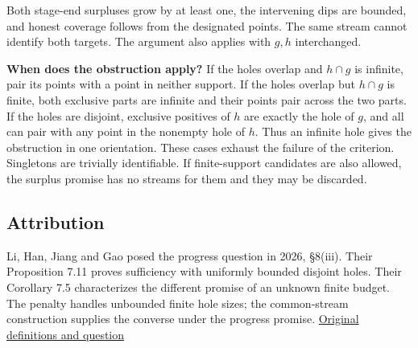 \documentclass[11pt]{article}
\begin{document}
Both stage-end surpluses grow by at least one, the intervening dips are bounded, and honest coverage follows from the designated points. The same stream cannot identify both targets. The argument also applies with \(g,h\) interchanged.

\textbf{When does the obstruction apply?} If the holes overlap and \(h\cap g\) is infinite, pair its points with a point in neither support. If the holes overlap but \(h\cap g\) is finite, both exclusive parts are infinite and their points pair across the two parts. If the holes are disjoint, exclusive positives of \(h\) are exactly the hole of \(g\), and all can pair with any point in the nonempty hole of \(h\). Thus an infinite hole gives the obstruction in one orientation. These cases exhaust the failure of the criterion. Singletons are trivially identifiable. If finite-support candidates are also allowed, the surplus promise has no streams for them and they may be discarded.

\subsection{Attribution}\label{attribution}

Li, Han, Jiang and Gao posed the progress question in 2026, §8(iii). Their Proposition 7.11 proves sufficiency with uniformly bounded disjoint holes. Their Corollary 7.5 characterizes the different promise of an unknown finite budget. The penalty handles unbounded finite hole sizes; the common-stream construction supplies the converse under the progress promise. \href{https://arxiv.org/abs/2605.06211v2}{Original definitions and question}
\end{document}
